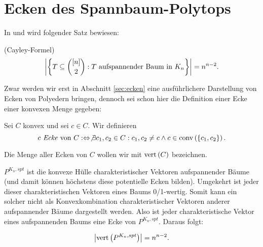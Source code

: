 \documentclass[10p,a4paper,BCOR = 12mm, DIV=15]{scrbook}
\begin{document}
\section{Ecken des Spannbaum-Polytops}

In \cite{matousek2007diskrete} und \cite{lovasz_combinatorics} wird folgender Satz bewiesen:
\begin{Sa}
(Cayley-Formel)
\begin{displaymath}
\left|\left\{T \subseteq {\left[n\right] \choose 2}: T\textnormal{ aufspannender Baum in }K_n\right\}\right| = n^{n-2}.
\end{displaymath}
\end{Sa}

Zwar werden wir erst in Abschnitt \ref{sec:ecken} eine ausführlichere Darstellung von Ecken von Polyedern bringen, dennoch sei schon hier die Definition einer Ecke einer konvexen Menge gegeben:

\begin{Def}
\label{def:ecke}
Sei $C$ konvex und sei $c \in C$. Wir definieren
\begin{displaymath}
c \textnormal{ \emph{Ecke} von }C :\Leftrightarrow \not\exists c_1, c_2 \in C: c_1, c_2 \neq c \wedge c \in \operatorname{conv} \left(\left\{c_1, c_2\right\}\right).
\end{displaymath}

Die Menge aller Ecken von $C$ wollen wir mit $\operatorname{vert} \left(C\right)$ bezeichnen.
\end{Def}

$P^{K_n, spt}$ ist die konvexe Hülle charakteristischer Vektoren aufspannender Bäume (und damit können höchstens diese potentielle Ecken bilden). Umgekehrt ist jeder dieser charakteristischen Vektoren eines Baums 0/1-wertig. Somit kann ein solcher nicht als Konvexkombination charakteristischer Vektoren anderer aufspannender Bäume dargestellt werden. Also ist jeder charakteristische Vektor eines aufspannenden Baums eine Ecke von $P^{K_n, spt}$. Daraus folgt:
\begin{Kor}
\begin{displaymath}
\left|\operatorname{vert} \left(P^{K_n, spt}\right)\right| = n^{n-2}.
\end{displaymath}
\end{Kor}
\end{document}
